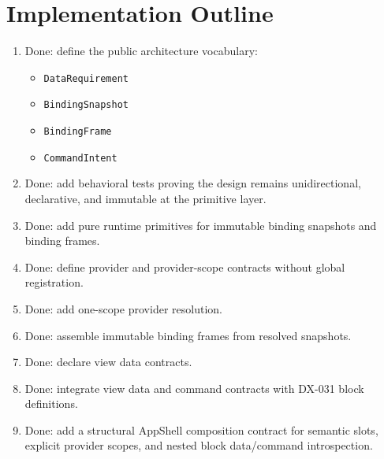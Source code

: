\section{Implementation Outline}\label{record-132-implementation-outline}

\begin{enumerate}
\def\labelenumi{\arabic{enumi}.}
\tightlist
\item
  Done: define the public architecture vocabulary:

  \begin{itemize}
  \tightlist
  \item
    \texttt{D\allowbreak{}a\allowbreak{}t\allowbreak{}a\allowbreak{}R\allowbreak{}e\allowbreak{}q\allowbreak{}u\allowbreak{}i\allowbreak{}r\allowbreak{}e\allowbreak{}m\allowbreak{}e\allowbreak{}n\allowbreak{}t}
  \item
    \texttt{B\allowbreak{}i\allowbreak{}n\allowbreak{}d\allowbreak{}i\allowbreak{}n\allowbreak{}g\allowbreak{}S\allowbreak{}n\allowbreak{}a\allowbreak{}p\allowbreak{}s\allowbreak{}h\allowbreak{}o\allowbreak{}t}
  \item
    \texttt{B\allowbreak{}i\allowbreak{}n\allowbreak{}d\allowbreak{}i\allowbreak{}n\allowbreak{}g\allowbreak{}F\allowbreak{}r\allowbreak{}a\allowbreak{}m\allowbreak{}e}
  \item
    \texttt{C\allowbreak{}o\allowbreak{}m\allowbreak{}m\allowbreak{}a\allowbreak{}n\allowbreak{}d\allowbreak{}I\allowbreak{}n\allowbreak{}t\allowbreak{}e\allowbreak{}n\allowbreak{}t}
  \end{itemize}
\item
  Done: add behavioral tests proving the design remains unidirectional, declarative, and immutable at the primitive layer.
\item
  Done: add pure runtime primitives for immutable binding snapshots and binding frames.
\item
  Done: define provider and provider-scope contracts without global registration.
\item
  Done: add one-scope provider resolution.
\item
  Done: assemble immutable binding frames from resolved snapshots.
\item
  Done: declare view data contracts.
\item
  Done: integrate view data and command contracts with DX-031 block definitions.
\item
  Done: add a structural AppShell composition contract for semantic slots, explicit provider scopes, and nested block data/command introspection.

\end{enumerate}
